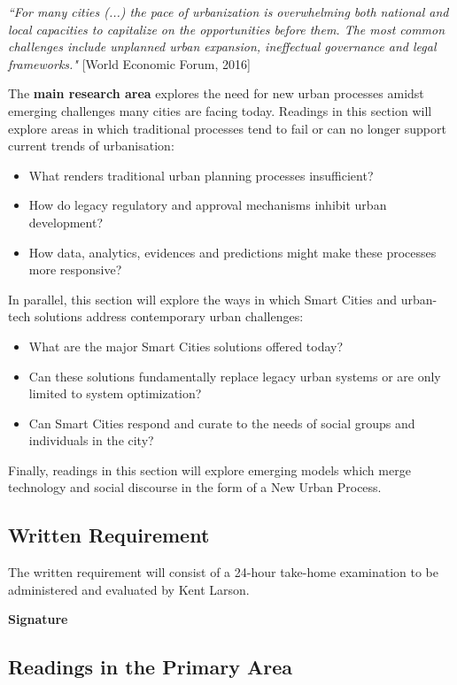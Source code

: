 \textit{``For many cities (...) the pace of urbanization is overwhelming both national and local capacities to capitalize on the opportunities before them. The most common challenges include unplanned urban expansion, ineffectual governance and legal frameworks."} [World Economic Forum, 2016]
\par
The \textbf{main research area} explores the need for new urban processes amidst emerging challenges many cities are facing today. Readings in this section will explore areas in which traditional processes tend to fail or can no longer support current trends of urbanisation:
\begin{itemize}
    \item What renders traditional urban planning processes insufficient? 
    \item How do legacy regulatory and approval mechanisms inhibit urban development? 
    \item How data, analytics, evidences and predictions might make these processes more responsive?
\end{itemize}
In parallel, this section will explore the ways in which Smart Cities and urban-tech solutions address contemporary urban challenges:
\begin{itemize}
    \item What are the major Smart Cities solutions offered today? 
    \item Can these solutions fundamentally replace legacy urban systems or are only limited to system optimization?
    \item Can Smart Cities respond and curate to the needs of social groups and individuals in the city?  
\end{itemize}
Finally, readings in this section will explore emerging models which merge technology and social discourse in the form of a New Urban Process.
\subsection*{Written Requirement}
The written requirement will consist of a 24-hour take-home examination to be administered and evaluated by Kent Larson.\par
\textbf{Signature}\hspace{0.5cm} \makebox[2in]{\hrulefill}
\newpage
\subsection*{Readings in the Primary Area}
